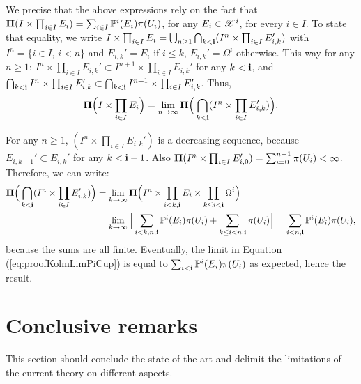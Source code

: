 We precise that the above expressions rely on the fact that $\mathbf{\Pi}(I\times\prod_{i\in I}E_i)=\sum_{i\in I}\mathbb{P}^i(E_i)\pi(U_i)$, for any $E_i\in\mathscr{X}^i$, for every ${i\in I}$. To state that equality, we write $I\times\prod_{i\in I}E_i=\bigcup_{n\geq1}\bigcap_{k<\mathbf{i}}(I^n\times\prod_{i\in I}E_{i,k}') $ with $I^n=\{i\in I,\,i< n\}$ and $E_{i,k}'=E_i$ if $i\leq k$, $E_{i,k}'=\Omega^i$ otherwise. This way for any $n\geq1$:
$I^n\times\prod_{i\in I} E_{i,k}' \subset I^{n+1}\times\prod_{i\in I} E_{i,k}'$ for any $k<\mathbf{i}$, and
$        \bigcap_{k<\mathbf{i}} I^n\times\prod_{i\in I} E_{i,k}'\subset \bigcap_{k<\mathbf{i}} I^{n+1}\times\prod_{i\in I} E_{i,k}'$.
Thus,
    \begin{equation}\label{eq:proofKolmLimPiCup}
        \mathbf{\Pi}\Big(I\times\prod_{i\in I}E_i\Big) 
            = \lim_{n\rightarrow\infty}\mathbf{\Pi}\Big(\bigcap_{k<\mathbf{i}}(I^n\times\prod_{i\in I}E_{i,k}')\Big).
    \end{equation}


For any $n\geq1$, $ %
(I^n\times\prod_{i\in I}E_{i,k}')$ is a decreasing sequence, because $E_{i,k+1}'\subset E_{i,k}'$ for any $k<\mathbf{i}-1$. 
Also $\mathbf{\Pi}(I^n\times\prod_{i\in I}E_{i,0}')=\sum_{i=0}^{n-1}\pi(U_i)<\infty$.
Therefore, we can write:
    \begin{align}
        \mathbf{\Pi}\Big(\bigcap_{k<\mathbf{i}}(I^n\times\prod_{i\in I}E_{i,k}')\Big) 
            &= \lim_{k\rightarrow\infty} \mathbf{\Pi}\Big(I^n\times\prod_{i<k,\mathbf{i}}E_i\times\prod_{k\leq i<\mathbf{i}}\Omega^i\Big) \\
            &= \lim_{k\rightarrow\infty} \Big[\sum_{i<k,n,\mathbf{i}}\mathbb{P}^i(E_i)\pi(U_i)  + \sum_{k\leq i<n,\mathbf{i}}\pi(U_i)\Big]=\sum_{i<n,\mathbf{i}}\mathbb{P}^i(E_i)\pi(U_i),\nonumber
    \end{align}
because the sums are all finite. Eventually, the limit in Equation (\ref{eq:proofKolmLimPiCup}) is equal to $\sum_{i<\mathbf{i}}\mathbb{P}^i(E_i)\pi(U_i)$ as expected, hence the result.






\section{Conclusive remarks}\label{sec:intro-ref:conclusion}


This section should conclude the state-of-the-art and delimit the limitations of the current theory on different aspects. 












